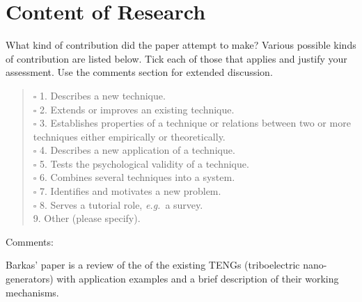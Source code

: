 \documentclass{article}
\begin{document}
\section{Content of Research}
{\small What kind of contribution did the paper attempt to make?
Various possible kinds of contribution are listed below.  Tick
each of those that applies and justify your assessment. Use the
comments section for extended discussion.}
\begin{verse}



$\square$
1. Describes a new technique.  \\
$\square$
2. Extends or improves an existing technique.  \\
$\square$
3. Establishes properties of a technique or relations between two
or more techniques either empirically or theoretically.  \\
$\square$
4. Describes a new application of a technique.  \\
$\square$
5. Tests the psychological validity of a technique.  \\
$\square$
6. Combines several techniques into a system.  \\
$\square$
7. Identifies and motivates a new problem.  \\
$\square$
8. Serves a tutorial role, {\em e.g.}~a survey.  \\
\makebox[0pt][l]{$\square$}\raisebox{.15ex}{\hspace{0.1em}$\checkmark$}
9. Other (please specify).  \\
\end{verse}
Comments:
\begin{mdframed}
Barkas' paper is a review of the of the existing TENGs (triboelectric nano-generators) with application examples and a brief description of their working mechanisms.
\end{mdframed}

\clearpage
\end{document}
